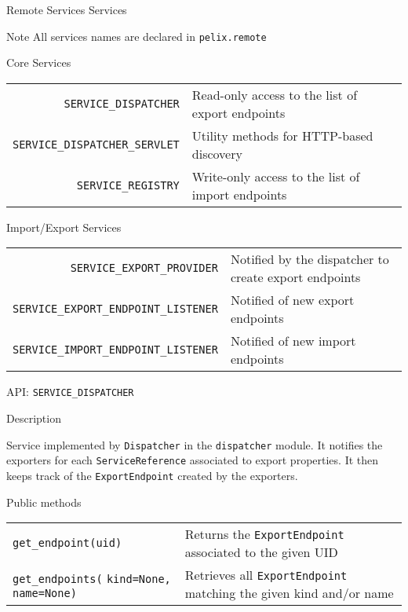 \begin{frame}{Remote Services Services}
\begin{exampleblock}{Note}
All services names are declared in \texttt{pelix.remote}
\end{exampleblock}

\begin{block}{Core Services}
\begin{small}
\begin{tabular}{rp{}}
\texttt{\scriptsize SERVICE\_DISPATCHER} & Read-only access to the list of export endpoints \\
\texttt{\scriptsize SERVICE\_DISPATCHER\_SERVLET} & Utility methods for HTTP-based discovery \\
\texttt{\scriptsize SERVICE\_REGISTRY} & Write-only access to the list of import endpoints \\
\end{tabular}
\end{small}
\end{block}

\begin{block}{Import/Export Services}
\begin{small}
\begin{tabular}{rp{}}
\texttt{\scriptsize SERVICE\_EXPORT\_PROVIDER} & Notified by the dispatcher to create export endpoints \\
\texttt{\scriptsize SERVICE\_EXPORT\_ENDPOINT\_LISTENER} & Notified of new export endpoints \\
\texttt{\scriptsize SERVICE\_IMPORT\_ENDPOINT\_LISTENER} & Notified of new import endpoints \\
\end{tabular}
\end{small}
\end{block}
\end{frame}

\begin{frame}{API: \texttt{SERVICE\_DISPATCHER}}
\begin{block}{Description}
\begin{small}
Service implemented by \texttt{Dispatcher} in the \texttt{dispatcher} module.
It notifies the exporters for each \texttt{ServiceReference} associated to export properties.
It then keeps track of the \texttt{ExportEndpoint} created by the exporters.
\end{small}
\end{block}

\begin{block}{Public methods}
\begin{tabular}{p{} p{}}
\texttt{get\_endpoint(uid)} & Returns the \texttt{ExportEndpoint} associated to the given UID \\
\texttt{get\_endpoints(} \texttt{kind=None, name=None)} & Retrieves all \texttt{ExportEndpoint} matching the given kind and/or name \\
\end{tabular}
\end{block}
\end{frame}
